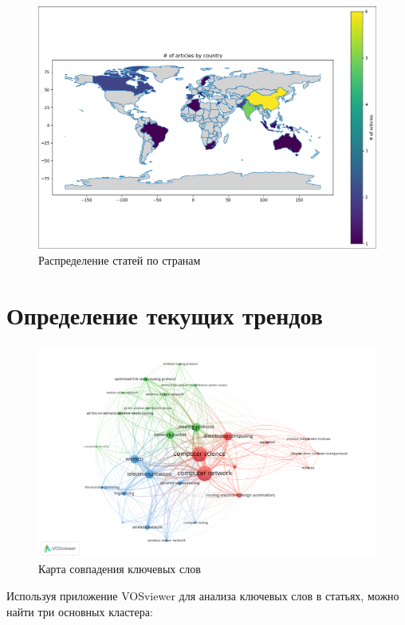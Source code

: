 \documentclass[%
]{report}
\begin{document}
\begin{figure}
\centering
\includegraphics[width=\pagewidth]{./assets/by-country.png}
\caption{Распределение статей по странам}
\end{figure}

\section{Определение текущих трендов}\label{defining-current-trends}

\begin{figure}
\centering
\includegraphics[width=\pagewidth]{./assets/co-occurence.png}
\caption{Карта совпадения ключевых слов}
\end{figure}

Используя приложение VOSviewer
для анализа ключевых слов в статьях,
можно найти три основных кластера:
\end{document}
